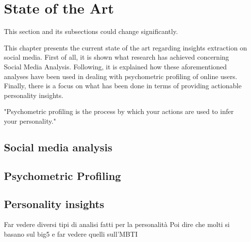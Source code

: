 \chapter{State of the Art}
This section and its subsections could change significantly.

This chapter presents the current state of the art regarding insights extraction on social media. First of all, it is shown what research has achieved concerning Social Media Analysis.
Following, it is explained how these aforementioned analyses have been used in dealing with psychometric profiling of online users.
Finally, there is a focus on what has been done in terms of providing actionable personality insights.

"Psychometric profiling is the process by which your actions are used to infer your personality."

\section{Social media analysis}
\section{Psychometric Profiling}
\section{Personality insights}
Far vedere diversi tipi di analisi fatti per la personalità
Poi dire che molti si basano sul big5 e far vedere quelli sull'MBTI